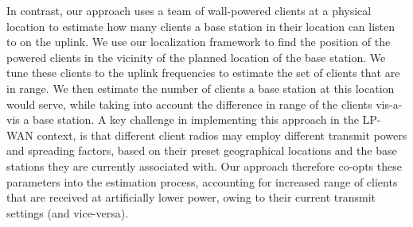 In contrast, our approach uses a team of wall-powered clients at a physical location to estimate how many clients a base station in their location can listen to on the uplink. We use our localization framework to find the position of the powered clients in the vicinity of the planned location of the base station. We tune these clients to the uplink frequencies to estimate the set of clients that are in range. We then estimate the number of clients a base station at this location would serve, while taking into account the difference in range of the clients vis-a-vis a base station. A key challenge in implementing this approach in the LP-WAN context, is that different client radios may employ different transmit powers and spreading factors, based on their preset geographical locations and the base stations they are currently associated with. Our approach therefore co-opts these parameters into the estimation process, accounting for increased range of clients that are received at artificially lower power, owing to their current transmit settings (and vice-versa). 

